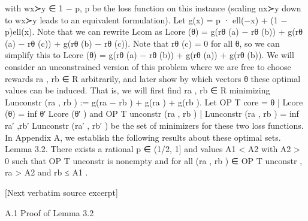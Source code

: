\documentclass[10pt]{article}
\begin{document}
\begin{ReviewVerbatim}
with wx≻y ∈ {1 − p, p} be the loss function on this instance (scaling nx≻y down to wx≻y leads to
an equivalent formulation). Let g(x) = p · ell(−x) + (1 − p)ell(x). Note that we can rewrite Lcom as
                    Lcore (θ) = g(rθ (a) − rθ (b)) + g(rθ (a) − rθ (c)) + g(rθ (b) − rθ (c)).
Note that rθ (c) = 0 for all θ, so we can simplify this to
                              Lcore (θ) = g(rθ (a) − rθ (b)) + g(rθ (a)) + g(rθ (b)).
We will consider an unconstrained version of this problem where we are free to choose rewards
ra , rb ∈ R arbitrarily, and later show by which vectors θ these optimal values can be induced. That
is, we will first find ra , rb ∈ R minimizing
                                Lunconstr (ra , rb ) := g(ra − rb ) + g(ra ) + g(rb ).
Let OP T core = {θ | Lcore (θ) = inf θ′ Lcore (θ′ )} and OP T unconstr {(ra , rb ) | Lunconstr (ra , rb ) =
inf ra′ ,rb′ Lunconstr (ra′ , rb′ )} be the set of minimizers for these two loss functions. In Appendix A, we
establish the following results about these optimal sets.
Lemma 3.2. There exists a rational p ∈ (1/2, 1] and values A1 < A2 with A2 > 0 such that
OP T unconstr is nonempty and for all (ra , rb ) ∈ OP T unconstr , ra > A2 and rb ≤ A1 .

[Next verbatim source excerpt]

A.1   Proof of Lemma 3.2


\end{ReviewVerbatim}
\end{document}
